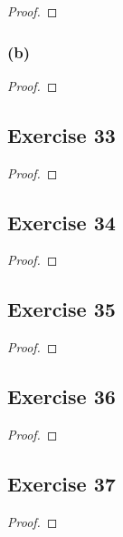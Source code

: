 \documentclass[14pt]{extarticle}
\begin{document}
\begin{proof}

\end{proof}

\subsubsection{(b)}

\begin{proof}

\end{proof}

\subsection{Exercise 33}

\begin{proof}

\end{proof}

\subsection{Exercise 34}

\begin{proof}

\end{proof}

\subsection{Exercise 35}

\begin{proof}

\end{proof}

\subsection{Exercise 36}

\begin{proof}

\end{proof}

\subsection{Exercise 37}

\begin{proof}

\end{proof}
\end{document}

